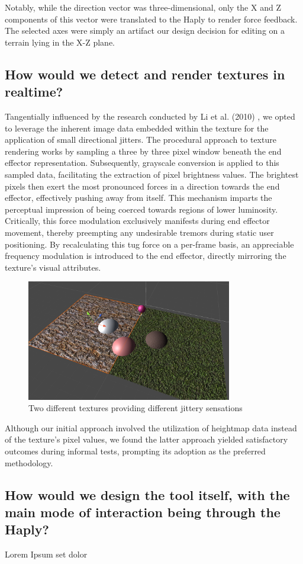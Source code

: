 Notably, while the direction vector was three-dimensional, only the X and Z components of this vector were translated to the Haply to render force feedback. The selected axes were simply an artifact our design decision for editing on a terrain lying in the X-Z plane.

\subsection{How would we detect and render textures in realtime?}

Tangentially influenced by the research conducted by Li et al. (2010) \cite{li2010image}, we opted to leverage the inherent image data embedded within the texture for the application of small directional jitters. The procedural approach to texture rendering works by sampling a three by three pixel window beneath the end effector representation. Subsequently, grayscale conversion is applied to this sampled data, facilitating the extraction of pixel brightness values. The brightest pixels then exert the most pronounced forces in a direction towards the end effector, effectively pushing away from itself. This mechanism imparts the perceptual impression of being coerced towards regions of lower luminosity. Critically, this force modulation exclusively manifests during end effector movement, thereby preempting any undesirable tremors during static user positioning. By recalculating this tug force on a per-frame basis, an appreciable frequency modulation is introduced to the end effector, directly mirroring the texture's visual attributes.

\begin{figure}[htbp]
    \centering
    \includegraphics[width=0.8\textwidth]{images/approach-texture-rendering.png} 
    \caption{Two different textures providing different jittery sensations}
    \label{fig:texture-rendering}
\end{figure}

Although our initial approach involved the utilization of heightmap data instead of the texture's pixel values, we found the latter approach yielded satisfactory outcomes during informal tests, prompting its adoption as the preferred methodology.

\subsection{How would we design the tool itself, with the main mode of interaction being through the Haply?}

Lorem Ipsum set dolor 

